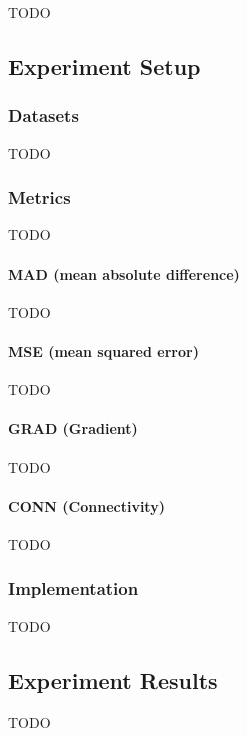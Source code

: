\documentclass[final]{cvpr}
\begin{document}
TODO

\subsection{Experiment Setup}

\subsubsection{Datasets}

TODO

\subsubsection{Metrics}

TODO

\paragraph{MAD (mean absolute difference)}

TODO

\paragraph{MSE (mean squared error)}

TODO

\paragraph{GRAD (Gradient)}

TODO

\paragraph{CONN (Connectivity)}

TODO

\subsubsection{Implementation}

TODO

\subsection{Experiment Results}

TODO
\end{document}
